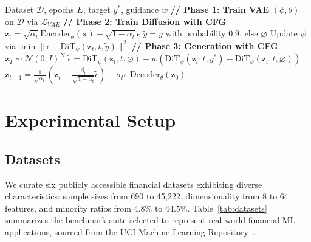 \documentclass[conference]{IEEEtran}
\newcommand{\retabsyn}{\textsc{RE-TabSyn}}
\begin{document}
\begin{algorithm}[htbp]
\caption{\retabsyn{} Training and Generation}
\begin{algorithmic}[1]
\REQUIRE Dataset $\mathcal{D}$, epochs $E$, target $y^*$, guidance $w$
\STATE \textbf{// Phase 1: Train VAE} $(\phi, \theta)$ on $\mathcal{D}$ via $\mathcal{L}_{VAE}$
\STATE \textbf{// Phase 2: Train Diffusion with CFG}
        \STATE $\mathbf{z}_t = \sqrt{\bar{\alpha}_t}\mathrm{Encoder}_\phi(\mathbf{x}) + \sqrt{1-\bar{\alpha}_t}\epsilon$
        \STATE $\tilde{y} = y$ with probability $0.9$, else $\varnothing$
        \STATE Update $\psi$ via $\min \|\epsilon - \mathrm{DiT}_\psi(\mathbf{z}_t, t, \tilde{y})\|^2$
    \ENDFOR
\ENDFOR
\STATE \textbf{// Phase 3: Generation with CFG}
\STATE $\mathbf{z}_T \sim \mathcal{N}(0, I)^N$
    \STATE $\tilde{\epsilon} = \mathrm{DiT}_\psi(\mathbf{z}_t, t, \varnothing) + w(\mathrm{DiT}_\psi(\mathbf{z}_t, t, y^*) - \mathrm{DiT}_\psi(\mathbf{z}_t, t, \varnothing))$
    \STATE $\mathbf{z}_{t-1} = \frac{1}{\sqrt{\alpha_t}}\left(\mathbf{z}_t - \frac{\beta_t}{\sqrt{1-\bar{\alpha}_t}}\tilde{\epsilon}\right) + \sigma_t \epsilon$
\ENDFOR
\RETURN $\mathrm{Decoder}_\theta(\mathbf{z}_0)$
\end{algorithmic}
\label{alg:logic}
\end{algorithm}

\section{Experimental Setup}
\vspace{-1mm}

\subsection{Datasets}
We curate six publicly accessible financial datasets exhibiting diverse characteristics: sample sizes from 690 to 45,222, dimensionality from 8 to 64 features, and minority ratios from 4.8\% to 44.5\%. Table~\ref{tab:datasets} summarizes the benchmark suite selected to represent real-world financial ML applications, sourced from the UCI Machine Learning Repository~\cite{dua2019uci}.
\end{document}
